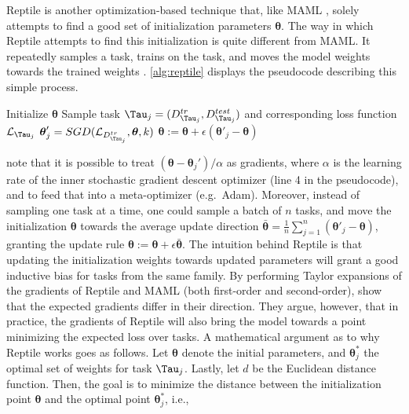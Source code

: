 Reptile  is another optimization-based technique that, like MAML , solely attempts to find a good set of initialization parameters $\boldsymbol{\theta}$. The way in which Reptile attempts to find this initialization is quite different from MAML. It repeatedly samples a task, trains on the task, and moves the model weights towards the trained weights . \autoref{alg:reptile} displays the pseudocode describing this simple process.
\begin{algorithm}
\caption{Reptile, by }\label{alg:reptile}
\begin{algorithmic}[1]
\State Initialize $\boldsymbol{\theta}$
\State Sample task $\Tau_{j} = (D^{tr}_{\Tau_{j}}, D^{test}_{\Tau_{j}})$ and corresponding loss function $\mathcal{L}_{\Tau_{j}}$
\State $\boldsymbol{\theta}'_{j} = SGD(\mathcal{L}_{D^{tr}_{\Tau_{j}}}, \boldsymbol{\theta}, k)$  
\State $\boldsymbol{\theta} := \boldsymbol{\theta} + \epsilon(\boldsymbol{\theta}'_{j} - \boldsymbol{\theta})$ 
\EndFor
\end{algorithmic}
\end{algorithm} 
 note that it is possible to treat $( \boldsymbol{\theta} - \boldsymbol{\theta}_{j}')/\alpha$ as gradients, where $\alpha$ is the learning rate of the inner stochastic gradient descent optimizer (line 4 in the pseudocode), and to feed that into a meta-optimizer (e.g.\ Adam). Moreover, instead of sampling one task at a time, one could sample a batch of $n$ tasks, and move the initialization $\boldsymbol{\theta}$ towards the average update direction $\bar{\boldsymbol{\theta}} = \frac{1}{n}\sum_{j=1}^{n}(\boldsymbol{\theta}'_{j} - \boldsymbol{\theta})$, granting the update rule $\boldsymbol{\theta} := \boldsymbol{\theta} + \epsilon \bar{\boldsymbol{\theta}}$. 
The intuition behind Reptile is that updating the initialization weights towards updated parameters will grant a good inductive bias for tasks from the same family. By performing Taylor expansions of the gradients of Reptile and MAML (both first-order and second-order),  show that the expected gradients differ in their direction. They argue, however, that in practice, the gradients of Reptile will also bring the model towards a point minimizing the expected loss over tasks. 
A mathematical argument as to why Reptile works goes as follows. Let $\boldsymbol{\theta}$ denote the initial parameters, and $\boldsymbol{\theta}^{*}_{j}$ the optimal set of weights for task $\Tau_{j}$. Lastly, let $d$ be the Euclidean distance function. Then, the goal is to minimize the distance between the initialization point $\boldsymbol{\theta}$ and the optimal point $\boldsymbol{\theta}^{*}_{j}$, i.e.,
